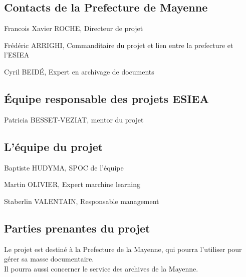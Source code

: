
\subsection {Contacts de la Prefecture de Mayenne}
Francois Xavier ROCHE, Directeur de projet \\
\par
Frédéric ARRIGHI, Commanditaire du projet et lien entre la prefecture et l'ESIEA \\
\par
Cyril BEIDÉ, Expert en archivage de documents \\



\subsection {Équipe responsable des projets ESIEA}
Patricia BESSET-VEZIAT, mentor du projet \\



\subsection {L'équipe du projet}
Baptiste HUDYMA, SPOC de l'équipe \\
\par
Martin OLIVIER, Expert marchine learning \\
\par
Staberlin VALENTAIN, Responsable management \\


\subsection {Parties prenantes du projet}
Le projet est destiné à la Prefecture de la Mayenne, qui pourra l'utiliser pour gérer sa masse documentaire. \\
Il pourra aussi concerner le service des archives de la Mayenne. \\


